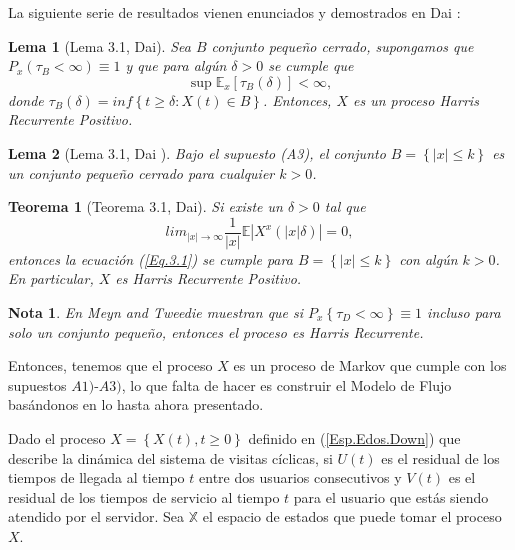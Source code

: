 \documentclass{article}
\newtheorem{Teo}{Teorema}[section]
\newtheorem{Note}{Nota}[section]
\newtheorem{Lema}{Lema}[section]
\newcommand{\esp}{\mathbb{E}}
\numberwithin{equation}{section}
\begin{document}
La siguiente serie de resultados vienen enunciados y demostrados en Dai \cite{Dai}:
\begin{Lema}[Lema 3.1, Dai\cite{Dai}]
Sea $B$ conjunto peque\~no cerrado, supongamos que $P_{x}\left(\tau_{B}<\infty\right)\equiv1$ y que para alg\'un $\delta>0$ se cumple que
\begin{equation}\label{Eq.3.1}
\sup\esp_{x}\left[\tau_{B}\left(\delta\right)\right]<\infty,
\end{equation}
donde $\tau_{B}\left(\delta\right)=inf\left\{t\geq\delta:X\left(t\right)\in B\right\}$. Entonces, $X$ es un proceso Harris Recurrente Positivo.
\end{Lema}

\begin{Lema}[Lema 3.1, Dai \cite{Dai}]\label{Lema.3.}
Bajo el supuesto (A3), el conjunto $B=\left\{|x|\leq k\right\}$ es un conjunto peque\~no cerrado para cualquier $k>0$.
\end{Lema}

\begin{Teo}[Teorema 3.1, Dai\cite{Dai}]\label{Tma.3.1}
Si existe un $\delta>0$ tal que 
\begin{equation}
lim_{|x|\rightarrow\infty}\frac{1}{|x|}\esp|X^{x}\left(|x|\delta\right)|=0,
\end{equation}
entonces la ecuaci\'on (\ref{Eq.3.1}) se cumple para $B=\left\{|x|\leq k\right\}$ con alg\'un $k>0$. En particular, $X$ es Harris Recurrente Positivo.
\end{Teo}

\begin{Note}
En Meyn and Tweedie \cite{MeynTweedie} muestran que si $P_{x}\left\{\tau_{D}<\infty\right\}\equiv1$ incluso para solo un conjunto peque\~no, entonces el proceso es Harris Recurrente.
\end{Note}

Entonces, tenemos que el proceso $X$ es un proceso de Markov que cumple con los supuestos $A1)$-$A3)$, lo que falta de hacer es construir el Modelo de Flujo bas\'andonos en lo hasta ahora presentado.



Dado el proceso $X=\left\{X\left(t\right),t\geq0\right\}$ definido
en (\ref{Esp.Edos.Down}) que describe la din\'amica del sistema de
visitas c\'iclicas, si $U\left(t\right)$ es el residual de los
tiempos de llegada al tiempo $t$ entre dos usuarios consecutivos y
$V\left(t\right)$ es el residual de los tiempos de servicio al
tiempo $t$ para el usuario que est\'as siendo atendido por el
servidor. Sea $\mathbb{X}$ el espacio de estados que puede tomar
el proceso $X$.
\end{document}
